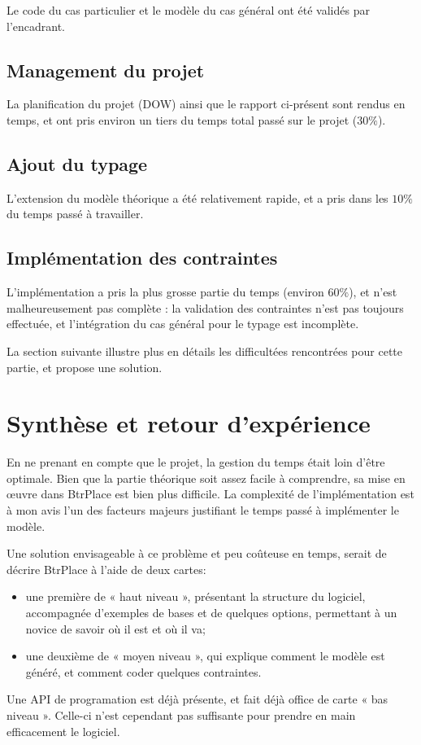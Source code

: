 \documentclass[a4paper]{article}
\begin{document}
Le code du cas particulier et le modèle du cas général ont été validés
par l'encadrant.

\subsection{Management du projet}
La planification du projet (DOW) ainsi que le rapport ci-présent sont
rendus en temps, et ont pris environ un tiers du temps total passé sur le
projet ($30\%$).
\subsection{Ajout du typage}
L'extension du modèle théorique a été relativement rapide, et a pris
dans les $10\%$ du temps passé à travailler.
\subsection{Implémentation des contraintes}
L'implémentation a pris la plus grosse partie du temps (environ $60\%$),
et n'est malheureusement pas complète : la validation des contraintes
n'est pas toujours effectuée, et l'intégration du cas général pour le typage
est incomplète.

La section suivante illustre plus en détails les difficultées rencontrées
pour cette partie, et propose une solution.
\section{Synthèse et retour d'expérience}
En ne prenant en compte que le projet, la gestion du temps était
loin d'être optimale. Bien que la partie théorique soit assez facile
à comprendre, sa mise en œuvre dans BtrPlace est bien plus difficile.
La complexité de l'implémentation est à mon avis l'un des facteurs
majeurs justifiant le temps passé à implémenter le modèle.

Une solution envisageable à ce problème et peu coûteuse en temps, serait 
de décrire BtrPlace à l'aide de deux cartes:
\begin{itemize}
	\item une première de « haut niveau », présentant la structure
		du logiciel, accompagnée d'exemples de bases et de quelques
		options, permettant à un novice de savoir où il est et où il va;
	\item une deuxième de « moyen niveau », qui explique comment le
		modèle est généré, et comment coder quelques contraintes.
\end{itemize}
Une API de programation est déjà présente, et fait déjà office de
carte « bas niveau ». Celle-ci n'est cependant pas suffisante pour
prendre en main efficacement le logiciel.
\end{document}
